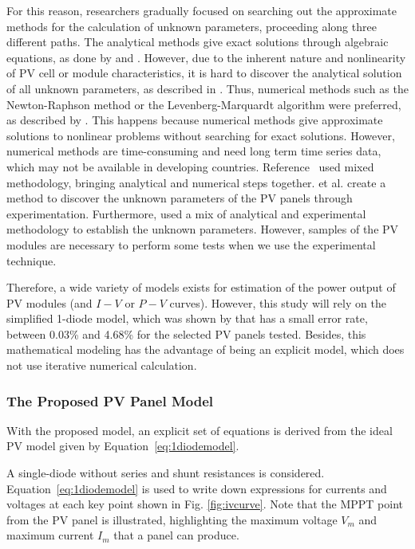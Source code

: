 For this reason, researchers gradually focused on searching out the approximate methods for the calculation of unknown parameters, proceeding along three different paths. The analytical methods give exact solutions through algebraic equations, as done by \cite{Cubas} and \cite{Brano}. However, due to the inherent nature and nonlinearity of PV cell or module characteristics, it is hard to discover the analytical solution of all unknown parameters, as described in \cite{Hasan}. Thus, numerical methods such as the Newton-Raphson method or the Levenberg-Marquardt algorithm were preferred, as described by \cite{Mellit}. This happens because numerical methods give approximate solutions to nonlinear problems without searching for exact solutions. However, numerical methods are time-consuming and need long term time series data, which may not be available in developing countries. Reference~\cite{Jakhrani} used mixed methodology, bringing analytical and numerical steps together. \cite{Shenawy} et al. create a method to discover the unknown parameters of the PV panels through experimentation. Furthermore, \cite{Tian} used a mix of analytical and experimental methodology to establish the unknown parameters. However, samples of the PV modules are necessary to perform some tests when we use the experimental technique. 

Therefore, a wide variety of models exists for estimation of the power output of PV modules (and $I-V$ or $P-V$ curves). However, this study will rely on the simplified 1-diode model, which was shown by \cite{Saloux} that has a small error rate, between 0.03\% and 4.68\% for the selected PV panels tested. Besides, this mathematical modeling has the advantage of being an explicit model, which does not use iterative numerical calculation. 

\subsubsection{The Proposed PV Panel Model}

With the proposed model, an explicit set of equations is derived from the ideal PV model given by Equation~\ref{eq:1diodemodel}.

A single-diode without series and shunt resistances is considered. Equation~\ref{eq:1diodemodel} is used to write down expressions for currents and voltages at each key point shown in Fig. \ref{fig:ivcurve}. Note that the MPPT point from the PV panel is illustrated, highlighting the maximum voltage $ V_{m} $ and maximum current $ I_{m} $ that a panel can produce.

